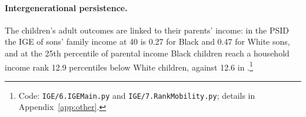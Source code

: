 \paragraph{Intergenerational persistence.} The children's adult outcomes are linked to their parents' income: in the PSID the IGE of sons' family income at 40 is 0.27 for Black
and 0.47 for White sons, and at the 25th percentile of parental income Black children reach a household income rank
12.9 percentiles below White children, against 12.6 in \citet{chetty2020race}.\footnote{Code:
\texttt{IGE/6.IGEMain.py} and \texttt{IGE/7.RankMobility.py}; details in Appendix~\ref{app:other}.}
